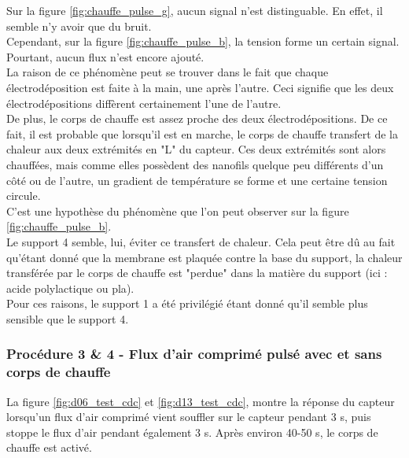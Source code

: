 Sur la figure \ref{fig:chauffe_pulse_g}, aucun signal n'est distinguable. En effet, il semble n'y avoir que du bruit. \\

Cependant, sur la figure \ref{fig:chauffe_pulse_b}, la tension forme un certain signal. Pourtant, aucun flux n'est encore ajouté. \\
La raison de ce phénomène peut se trouver dans le fait que chaque électrodéposition est faite à la main, une après l'autre. Ceci signifie que
les deux électrodépositions diffèrent certainement l'une de l'autre. \\
De plus, le corps de chauffe est assez proche des deux électrodépositions. De ce fait, il est probable que lorsqu'il est en marche, le corps de
chauffe transfert de la chaleur aux deux extrémités en "L" du capteur. Ces deux extrémités sont alors chauffées, mais comme elles possèdent des nanofils
quelque peu différents d'un côté ou de l'autre, un gradient de température se forme et une certaine tension circule. \\
C'est une hypothèse du phénomène que l'on peut observer sur la figure \ref{fig:chauffe_pulse_b}.\\

Le support 4 semble, lui, éviter ce transfert de chaleur. Cela peut être dû au fait qu'étant donné que la membrane est plaquée contre
la base du support, la chaleur transférée par le corps de chauffe est "perdue" dans la matière du support (ici : acide polylactique ou \gls{pla}).\\

Pour ces raisons, le support 1 a été privilégié étant donné qu'il semble plus sensible que le support 4.\\

\subsubsection{Procédure 3 \& 4 -  Flux d'air comprimé pulsé avec et sans corps de chauffe}
La figure \ref{fig:d06_test_cdc} et \ref{fig:d13_test_cdc}, montre la réponse du capteur lorsqu'un flux d'air comprimé vient souffler sur le capteur pendant 3 s, puis 
stoppe le flux d'air pendant également 3 s. Après environ 40-50 s, le corps de chauffe est activé. 

